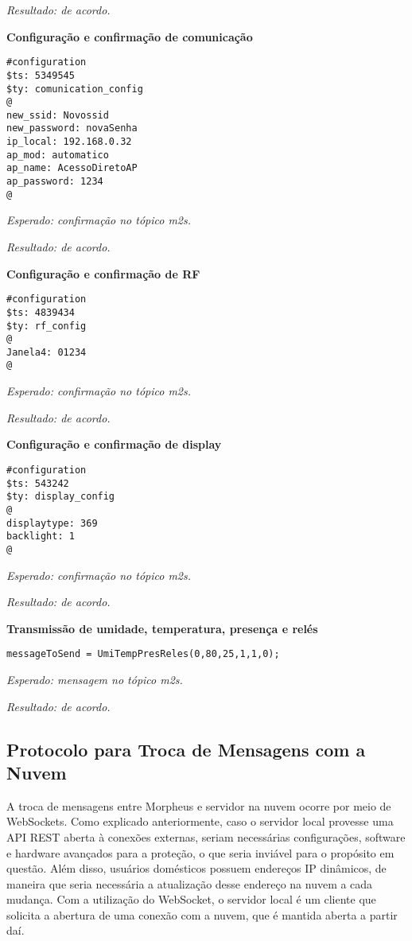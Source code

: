 \emph{Resultado: de acordo.}

\textbf{Configuração e confirmação de comunicação}
\begin{lstlisting}
#configuration
$ts: 5349545
$ty: comunication_config
@
new_ssid: Novossid
new_password: novaSenha
ip_local: 192.168.0.32
ap_mod: automatico
ap_name: AcessoDiretoAP
ap_password: 1234
@
\end{lstlisting}

\emph{Esperado: confirmação no tópico \wmqtt{} m2s.}

\emph{Resultado: de acordo.}

\textbf{Configuração e confirmação de RF}
\begin{lstlisting}
#configuration
$ts: 4839434
$ty: rf_config
@
Janela4: 01234
@
\end{lstlisting}

\emph{Esperado: confirmação no tópico \wmqtt{} m2s.}

\emph{Resultado: de acordo.}

\textbf{Configuração e confirmação de display}
\begin{lstlisting}
#configuration
$ts: 543242
$ty: display_config
@
displaytype: 369
backlight: 1
@
\end{lstlisting}

\emph{Esperado: confirmação no tópico \wmqtt{} m2s.}

\emph{Resultado: de acordo.}

\textbf{Transmissão de umidade, temperatura, presença e relés}
\begin{lstlisting}
messageToSend = UmiTempPresReles(0,80,25,1,1,0);
\end{lstlisting}

\emph{Esperado: mensagem no tópico \wmqtt{} m2s.}

\emph{Resultado: de acordo.}

\subsection{Protocolo para Troca de Mensagens com a Nuvem}
A troca de mensagens entre Morpheus e servidor na nuvem ocorre por meio de WebSockets. Como explicado anteriormente, caso o servidor local provesse uma API REST aberta à conexões externas, seriam necessárias configurações, software e hardware avançados para a proteção, o que seria inviável para o propósito em questão. Além disso, usuários domésticos possuem endereços IP dinâmicos, de maneira que seria necessária a atualização desse endereço na nuvem a cada mudança. Com a utilização do WebSocket, o servidor local é um cliente que solicita a abertura de uma conexão com a nuvem, que é mantida aberta a partir daí.

